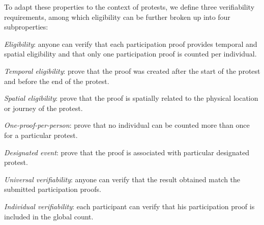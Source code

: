To adapt these properties to the context of protests, we define three verifiability requirements, among which eligibility can be further broken up into four subproperties:
\begin{requirements}[V]
  \item\label{EligibilityVerif} \emph{Eligibility}: anyone can verify that each participation proof provides temporal and spatial eligibility and that only one participation proof is counted per individual.
    \begin{requirements}
    \item\label{TemporallyRelated} \emph{Temporal eligibility}: prove that the proof was created after the start of the protest and before the end of the protest.
    \item\label{SpatiallyRelated} \emph{Spatial eligibility}: prove that the proof is spatially related to the physical location or journey of the protest.
    \item\label{CountOnce} \emph{One-proof-per-person}: prove that no individual can be counted more than once for a particular protest.
    \item\label{DesignatedEvent} \emph{Designated event}: prove that the proof is associated with particular designated protest.
    \end{requirements}

  \item\label{UniversalVerif} \emph{Universal verifiability}: anyone can verify that the result obtained match the submitted participation proofs.

  \item\label{IndividualVerif} \emph{Individual verifiability}: each participant can verify that his participation proof is included in the global count.
\end{requirements}

